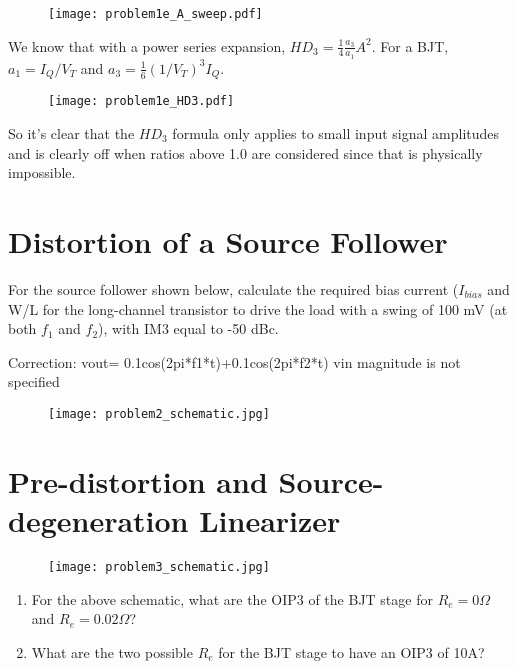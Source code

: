 \begin{enumerate}[label=(\alph*)]
    \begin{figure}[H]
        \centering \texttt{[image: problem1e\_A\_sweep.pdf]}
    \end{figure}

    We know that with a power series expansion, $HD_3 = \frac{1}{4} \frac{a_3}{a_1} A^2$.
    For a BJT, $a_1 = I_Q/V_T$ and $a_3 = \frac{1}{6} (1/V_T)^3 I_Q$.

    \begin{figure}[H]
        \centering \texttt{[image: problem1e\_HD3.pdf]}
    \end{figure}

    So it's clear that the $HD_3$ formula only applies to small input signal amplitudes and is clearly off when ratios above 1.0 are considered since that is physically impossible.

\end{enumerate}

\section{Distortion of a Source Follower}
{\color{blue} For the source follower shown below, calculate the required bias current ($I_{bias}$ and W/L for the long-channel transistor to drive the load with a swing of 100 mV (at both $f_1$ and $f_2$), with IM3 equal to -50 dBc.}

{\color{red} Correction: vout= 0.1cos(2pi*f1*t)+0.1cos(2pi*f2*t) vin magnitude is not specified}

\begin{figure}[H]
    \centering \texttt{[image: problem2\_schematic.jpg]}
\end{figure}

\section{Pre-distortion and Source-degeneration Linearizer}
\begin{figure}[H]
    \centering \texttt{[image: problem3\_schematic.jpg]}
\end{figure}

\begin{enumerate}[label=(\alph*)]
    \item {\color{blue} For the above schematic, what are the OIP3 of the BJT stage for $R_e = 0 \Omega$ and $R_e = 0.02 \Omega$?}

    \item {\color{blue} What are the two possible $R_e$ for the BJT stage to have an OIP3 of 10A?}
\end{enumerate}


